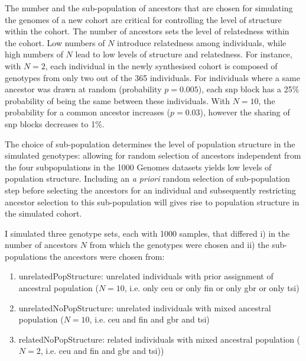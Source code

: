 The number and the sub-population of ancestors that are chosen for simulating the genomes of a new cohort are critical for controlling the level of structure within the cohort. The number of ancestors sets the level of relatedness within the cohort. Low numbers of \(N\) introduce relatedness among individuals, while high numbers of \(N\) lead to low levels of structure and relatedness. For instance, with \(N=2\), each individual in the newly synthesised cohort is composed of genotypes from only two out of the \num{365} individuals. For individuals where a same ancestor was drawn at random (probability \(p=0.005\)), each \gls{snp} block has a \num{25}\% probability of being the same between these individuals. With \(N=10\), the probability for a common ancestor increases (\(p=0.03\)), however the sharing of \gls{snp} blocks decreases to \num{1}\%. 

The choice of sub-population determines the level of population structure in the simulated genotypes: allowing for random selection of ancestors independent from the four subpopulations in the 1000 Genomes datasets yields low levels of population structure. Including an \textit{a priori} random selection of sub-population step before selecting the ancestors for an individual and subsequently restricting ancestor selection to this sub-population will gives rise to population structure in the simulated cohort. 

I simulated three genotype sets, each with \num{1000} samples, that differed i) in the number of ancestors \(N\) from which the genotypes were chosen and ii) the sub-populations the ancestors were chosen from:
\begin{enumerate}[label=\Alph*.]
\item unrelatedPopStructure: unrelated individuals with prior assignment of ancestral population  (\(N=10\), i.e. only \gls{ceu} or only \gls{fin} or only \gls{gbr} or only \gls{tsi})
\item unrelatedNoPopStructure: unrelated individuals with mixed ancestral population  (\(N=10\), i.e. \gls{ceu} and \gls{fin} and  \gls{gbr} and \gls{tsi})
\item relatedNoPopStructure: related individuals with mixed ancestral population (\(N=2\), i.e. \gls{ceu} and \gls{fin} and  \gls{gbr} and \gls{tsi}))
\end{enumerate}


